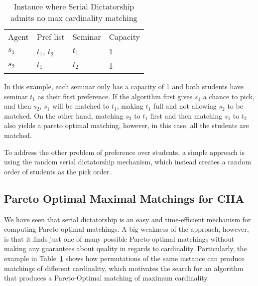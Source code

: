 \begin{table}[h!]
    \centering 
    \begin{tabular}{llll}
    Agent   & Pref list     & Seminar   & Capacity \\
    $s_1$   & $t_1$, $t_2$  & $t_1$     & 1        \\
    $s_2$   & $t_1$         & $t_2$     & 1       
    \end{tabular}
    \caption{Instance where Serial Dictatorship admits no max cardinality matching}
    \label{table:1}
\end{table} 

In this example, each seminar only has a capacity of 1 and both students have seminar $t_1$ as their first preference. If the algorithm first gives $s_1$ a chance to pick, and then $s_2$, $s_1$ will be matched to $t_1$, making $t_1$ full and not allowing $s_2$ to be matched. On the other hand, matching $s_2$ to $t_1$ first and then matching $s_1$ to $t_2$ also yields a pareto optimal matching, however, in this case, all the students are matched.

To address the other problem of preference over students, a simple approach is using the random serial dictatorship mechanism, which instead creates a random order of students as the pick order.

\subsection{Pareto Optimal Maximal Matchings for CHA}\label{algo-max-po}
We have seen that serial dictatorship is an easy and time-efficient mechanism for computing Pareto-optimal matchings. A big weakness of the approach, however, is that it finds just one of many possible Pareto-optimal matchings without making any guarantees about quality in regards to cardinality. Particularly, the example in \mbox{Table \ref{table:1}} shows how permutations of the same instance can produce matchings of different cardinality, which motivates the search for an algorithm that produces a Pareto-Optimal matching of maximum cardinality. 

